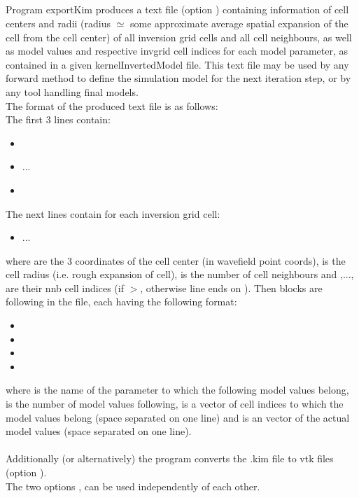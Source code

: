 \subsection{} \label{programs_scripts,sec:bin_prog,sec:exp_Kim}
Program exportKim produces a text file (option ) containing information of cell centers and radii 
(radius $\simeq$ some approximate average spatial expansion of the cell from the cell center) 
of all inversion grid cells and all cell neighbours, as well as model values and 
respective invgrid cell indices for each model parameter, as contained in a given kernelInvertedModel file. 
This text file may be used by any forward method to define the simulation model for the next iteration step, 
or by any tool handling final models.\\
The format of the produced text file is as follows:\\
The first 3 lines contain:
\begin{itemize}
\item[]
\item[]   ... 
\item[]
\end{itemize}
The next  lines contain for each inversion grid cell:
\begin{itemize}
\item[] ... 
\end{itemize} 
where  are the 3 coordinates of the cell center (in wavefield point coords),  
is the cell radius (i.e. rough expansion of cell),  is the number of cell neighbours and 
,..., are their nnb cell indices (if \(>\), otherwise line 
ends on ). Then  blocks are following in the file, each having 
the following format:
\begin{itemize}
\item[]
\item[]
\item[]
\item[]
\end{itemize}
where  is the name of the parameter to which the following model values belong, 
 is the number of model values following,  is a vector of  
cell indices to which the model values belong (space separated on one line) and  
is an vector of the actual  model values (space separated on one line).\\
\\
Additionally (or alternatively) the program converts the .kim file to vtk files (option ).\\
The two options  ,  can be used independently of each other.
